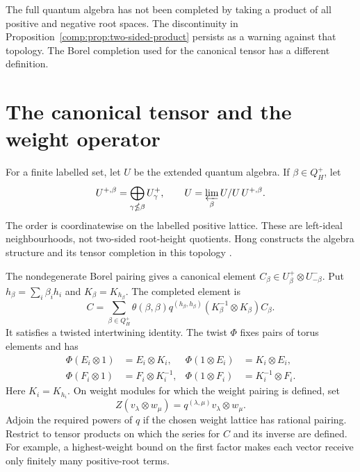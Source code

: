 The full quantum algebra has not been completed by taking a product
of all positive and negative root spaces. The discontinuity in
Proposition~\ref{comp:prop:two-sided-product} persists as a warning
against that topology. The Borel completion used for the canonical
tensor has a different definition.

\section{The canonical tensor and the weight operator}
For a finite labelled set, let \(U\) be the extended quantum
algebra. If \(\beta\in Q_H^+\), let
\[
 U^{+,\beta}=\bigoplus_{\gamma\nleq\beta}U^+_\gamma,
 \qquad \widehat U=\varprojlim_\beta U/U\,U^{+,\beta}.
\]
The order is coordinatewise on the labelled positive lattice.
These are left-ideal neighbourhoods, not two-sided root-height
quotients. Hong constructs the algebra structure and its tensor
completion in this topology \cite[(7.2)]{Hong98}.

The nondegenerate Borel pairing gives a canonical element
\(C_\beta\in U^+_\beta\otimes U^-_{-\beta}\).
Put \(h_\beta=\sum_i\beta_i h_i\) and \(K_\beta=K_{h_\beta}\).
The completed element is
\[
 C=\sum_{\beta\in Q_H^+}\theta(\beta,\beta)
       q^{(h_\beta,h_\beta)}
       (K_\beta^{-1}\otimes K_\beta)C_\beta.
\]
It satisfies a twisted intertwining identity. The twist \(\Phi\)
fixes pairs of torus elements and has
\[
\begin{aligned}
 \Phi(E_i\otimes1)&=E_i\otimes K_i,&
 \Phi(1\otimes E_i)&=K_i\otimes E_i,\\
 \Phi(F_i\otimes1)&=F_i\otimes K_i^{-1},&
 \Phi(1\otimes F_i)&=K_i^{-1}\otimes F_i.
\end{aligned}
\]
Here \(K_i=K_{h_i}\). On weight modules for which the weight
pairing is defined, set
\[
 Z(v_\lambda\otimes w_\mu)=q^{(\lambda,\mu)}
                              v_\lambda\otimes w_\mu.
\]
Adjoin the required powers of \(q\) if the chosen weight lattice
has rational pairing. Restrict to tensor products on which the
series for \(C\) and its inverse are defined. For example, a
highest-weight bound on the first factor makes each vector receive
only finitely many positive-root terms.


